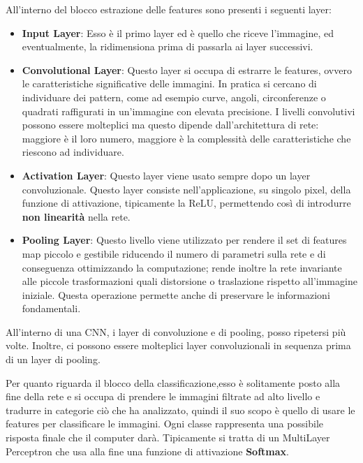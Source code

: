 All'interno del blocco estrazione delle features sono presenti i seguenti layer:
\begin{itemize}
    \item \textbf{Input Layer}: Esso è il primo layer ed è quello che riceve l’immagine, 
    ed eventualmente, la ridimensiona prima di passarla ai layer successivi.

    \item \textbf{Convolutional Layer}: Questo layer si occupa di estrarre le features, ovvero 
    le caratteristiche significative delle immagini. In pratica si cercano di individuare 
    dei pattern, come ad esempio curve, angoli, circonferenze o quadrati raffigurati in un’immagine con elevata precisione.
    I livelli convolutivi possono essere molteplici ma questo dipende dall'architettura di
    rete: maggiore è il loro numero, maggiore è la complessità delle caratteristiche che
    riescono ad individuare.

    \item \textbf{Activation Layer}: Questo layer viene usato sempre dopo un
    layer convoluzionale. Questo layer consiste nell'applicazione, su singolo pixel, della funzione
    di attivazione, tipicamente la ReLU, permettendo così di introdurre \textbf{non linearità} nella rete. 
    
    \item \textbf{Pooling Layer}: Questo livello viene utilizzato per rendere il set di features map 
    piccolo e gestibile riducendo il numero di parametri sulla rete e di conseguenza 
    ottimizzando la computazione; rende inoltre la rete invariante alle piccole trasformazioni quali distorsione o traslazione
    rispetto all’immagine iniziale. Questa operazione permette anche di preservare le 
    informazioni fondamentali.

\end{itemize}

All'interno di una CNN, i layer di convoluzione e di pooling, posso ripetersi più volte. 
Inoltre, 
ci possono essere  molteplici layer convoluzionali in sequenza prima di un layer di pooling. 

Per quanto riguarda il blocco della classificazione,esso è solitamente posto alla fine 
della rete e si occupa di prendere le immagini filtrate ad alto livello e tradurre in 
categorie ciò che ha analizzato, quindi il suo scopo è
quello di usare le features per classificare le immagini. Ogni classe rappresenta una
possibile risposta finale che il computer darà.
Tipicamente si tratta di un MultiLayer Perceptron che usa alla fine una funzione di 
attivazione \textbf{Softmax}.

